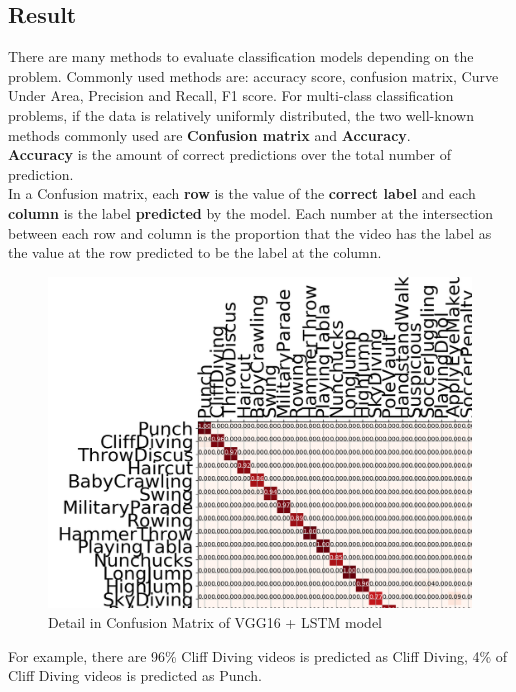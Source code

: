 \subsection{Result}
There are many methods to evaluate classification models depending on the problem. Commonly used methods are: accuracy score, confusion matrix, Curve Under Area, Precision and Recall, F1 score. For multi-class classification problems, if the data is relatively uniformly distributed, the two well-known methods commonly used are \textbf{Confusion matrix} and \textbf{Accuracy}.\\ 
\textbf{Accuracy} is the amount of correct predictions over the total number of prediction.\\
In a Confusion matrix, each \textbf{row} is the value of the \textbf{correct label} and each \textbf{column} is the label \textbf{predicted} by the model. Each number at the intersection between each row and column is the proportion that the video has the label as the value at the row predicted to be the label at the column.\\
\begin{center}
	\begin{figure}[H]
		\centering
		\includegraphics[width=1\columnwidth]{images/chap3/CFM-zoom.png}
		\caption{Detail in Confusion Matrix of VGG16 + LSTM model}
		\label{chap3:cfm-zoom}
	\end{figure}
\end{center}
\vspace{-1cm}
For example, there are 96\% Cliff Diving videos is predicted as Cliff Diving, 4\% of Cliff Diving videos is predicted as Punch.\\
